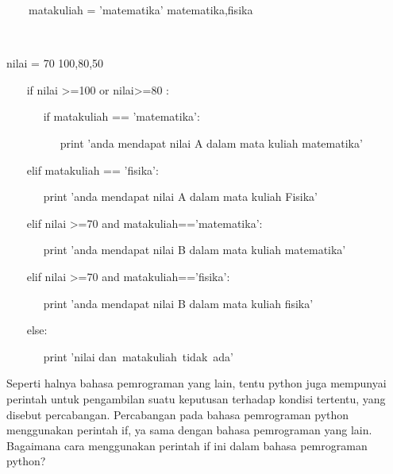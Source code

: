 \vspace{12pt}
\noindent 
~~~~matakuliah = 'matematika'   matematika,fisika \par
\noindent 
~~  \par
\noindent 
 nilai = 70 100,80,50 \par
\vspace{12pt}
\noindent 
~~~ if nilai >=100 or nilai>=80 : \par
\vspace{12pt}
\noindent 
~~~~~~ if matakuliah == 'matematika': \par
\vspace{12pt}
\noindent 
~~~~~~~~~ print 'anda mendapat nilai A dalam mata kuliah matematika' \par
\vspace{12pt}
\noindent 
~~~ elif matakuliah == 'fisika': \par
\vspace{12pt}
\noindent 
~~~~~~ print 'anda mendapat nilai A dalam mata kuliah Fisika' \par
\vspace{12pt}
\noindent 
~~~ elif nilai >=70 and matakuliah=='matematika': \par
\vspace{12pt}
\vspace{12pt}
\noindent 
~~~~~~ print 'anda mendapat nilai B dalam mata kuliah matematika' \par
\vspace{12pt}
\noindent 
~~~ elif nilai >=70 and matakuliah=='fisika': \par
\vspace{12pt}
\noindent 
~~~~~~ print 'anda mendapat nilai B dalam mata kuliah fisika' \par
\vspace{12pt}
\noindent 
~~~ else: \par
\vspace{12pt}
\noindent 
~~~~~~ print 'nilai dan~matakuliah~tidak~ada'~~~     \par
\vspace{12pt}
\noindent 
Seperti halnya bahasa pemrograman yang lain, tentu python juga mempunyai perintah untuk pengambilan suatu keputusan terhadap kondisi tertentu, yang disebut percabangan. Percabangan pada bahasa pemrograman python menggunakan perintah if, ya sama dengan bahasa pemrograman yang lain. Bagaimana cara menggunakan perintah if ini dalam bahasa pemrograman python? \par
\noindent 
\vspace{\baselineskip}
